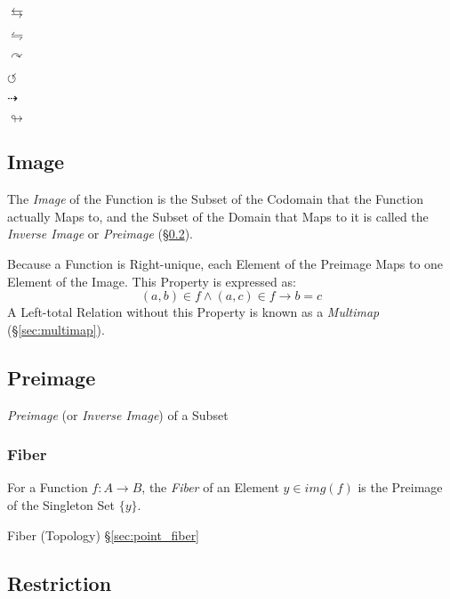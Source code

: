$\leftrightarrows$

$\leftrightharpoons$

$\curvearrowright$

$\circlearrowleft$

$\dashrightarrow$

$\looparrowright$



\subsection{Image}\label{sec:image}

The \emph{Image} of the Function is the Subset of the Codomain that
the Function actually Maps to, and the Subset of the Domain that Maps
to it is called the \emph{Inverse Image} or \emph{Preimage}
(\S\ref{sec:preimage}).

Because a Function is Right-unique, each Element of the Preimage Maps
to one Element of the Image. This Property is expressed as:
\[
  (a,b) \in f \wedge (a,c) \in f \rightarrow b = c
\]
A Left-total Relation without this Property is known as a
\emph{Multimap} (\S\ref{sec:multimap}).



\subsection{Preimage}\label{sec:preimage}

\emph{Preimage} (or \emph{Inverse Image}) of a Subset



\subsubsection{Fiber}\label{sec:fiber}

For a Function $f : A \rightarrow B$, the \emph{Fiber} of an Element
$y \in img(f)$ is the Preimage of the Singleton Set $\{y\}$.

Fiber (Topology) \S\ref{sec:point_fiber}



\subsection{Restriction}\label{sec:function_restriction}

